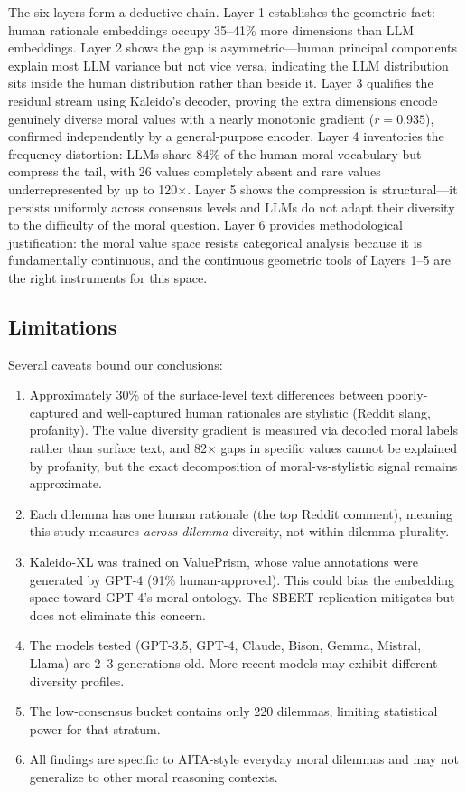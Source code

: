 \documentclass[11pt,a4paper]{article}
\begin{document}
The six layers form a deductive chain. Layer 1 establishes the geometric fact: human rationale embeddings occupy 35--41\% more dimensions than LLM embeddings. Layer 2 shows the gap is asymmetric---human principal components explain most LLM variance but not vice versa, indicating the LLM distribution sits inside the human distribution rather than beside it. Layer 3 qualifies the residual stream using Kaleido's decoder, proving the extra dimensions encode genuinely diverse moral values with a nearly monotonic gradient ($r = 0.935$), confirmed independently by a general-purpose encoder. Layer 4 inventories the frequency distortion: LLMs share 84\% of the human moral vocabulary but compress the tail, with 26 values completely absent and rare values underrepresented by up to 120$\times$. Layer 5 shows the compression is structural---it persists uniformly across consensus levels and LLMs do not adapt their diversity to the difficulty of the moral question. Layer 6 provides methodological justification: the moral value space resists categorical analysis because it is fundamentally continuous, and the continuous geometric tools of Layers 1--5 are the right instruments for this space.

\subsection{Limitations}

Several caveats bound our conclusions:

\begin{enumerate}[nosep]
    \item Approximately 30\% of the surface-level text differences between poorly-captured and well-captured human rationales are stylistic (Reddit slang, profanity). The value diversity gradient is measured via decoded moral labels rather than surface text, and 82$\times$ gaps in specific values cannot be explained by profanity, but the exact decomposition of moral-vs-stylistic signal remains approximate.
    \item Each dilemma has one human rationale (the top Reddit comment), meaning this study measures \emph{across-dilemma} diversity, not within-dilemma plurality.
    \item Kaleido-XL was trained on ValuePrism, whose value annotations were generated by GPT-4 (91\% human-approved). This could bias the embedding space toward GPT-4's moral ontology. The SBERT replication mitigates but does not eliminate this concern.
    \item The models tested (GPT-3.5, GPT-4, Claude, Bison, Gemma, Mistral, Llama) are 2--3 generations old. More recent models may exhibit different diversity profiles.
    \item The low-consensus bucket contains only 220 dilemmas, limiting statistical power for that stratum.
    \item All findings are specific to AITA-style everyday moral dilemmas and may not generalize to other moral reasoning contexts.
\end{enumerate}
\end{document}
